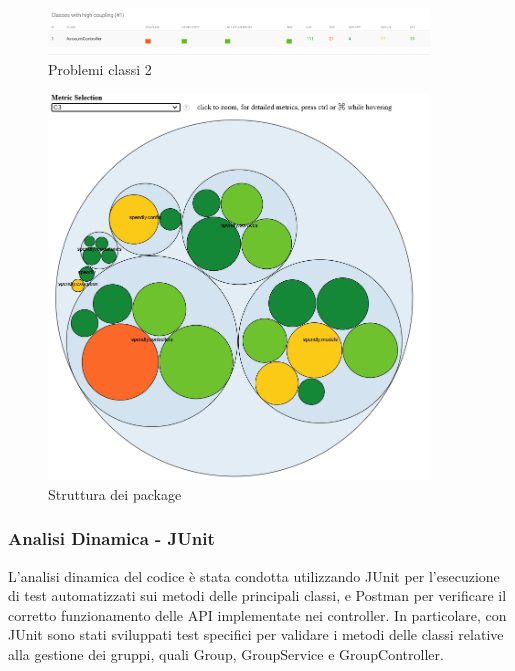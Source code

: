 \begin{figure}[H]
    \centering
    \includegraphics[width=0.9\textwidth]{images/Problem3_iter1.png}
    \caption{Problemi classi 2}
    \label{fig:Problemi_iterazione1}
\end{figure}



\begin{figure}[H]
    \centering
    \includegraphics[width=0.9\textwidth]{images/CodeMR_graph2.png}
    \caption{Struttura dei package}
    \label{fig:Package_iterazione1}
\end{figure}


\subsubsection{Analisi Dinamica - JUnit}

L'analisi dinamica del codice è stata condotta utilizzando JUnit per l'esecuzione di test automatizzati sui metodi delle principali classi, e Postman per verificare il corretto funzionamento delle API implementate nei controller.
In particolare, con JUnit sono stati sviluppati test specifici per validare i metodi delle classi relative alla gestione dei gruppi, quali Group, GroupService e GroupController.

